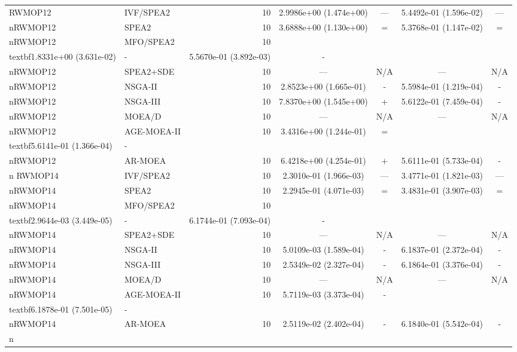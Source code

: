 \begin{table}[t]
{\begin{tabular}{llrcccc}
RWMOP12 & IVF/SPEA2 & 10 & 2.9986e+00 (1.474e+00) & --- & 5.4492e-01 (1.596e-02) & --- \\nRWMOP12 & SPEA2 & 10 & 3.6888e+00 (1.130e+00) & = & 5.3768e-01 (1.147e-02) & = \\nRWMOP12 & MFO/SPEA2 & 10 & \\textbf{1.8331e+00 (3.631e-02)} & - & 5.5670e-01 (3.892e-03) & - \\nRWMOP12 & SPEA2+SDE & 10 & --- & N/A & --- & N/A \\nRWMOP12 & NSGA-II & 10 & 2.8523e+00 (1.665e-01) & - & 5.5984e-01 (1.219e-04) & - \\nRWMOP12 & NSGA-III & 10 & 7.8370e+00 (1.545e+00) & + & 5.6122e-01 (7.459e-04) & - \\nRWMOP12 & MOEA/D & 10 & --- & N/A & --- & N/A \\nRWMOP12 & AGE-MOEA-II & 10 & 3.4316e+00 (1.244e-01) & = & \\textbf{5.6141e-01 (1.366e-04)} & - \\nRWMOP12 & AR-MOEA & 10 & 6.4218e+00 (4.254e-01) & + & 5.6111e-01 (5.733e-04) & - \\n\midrule
RWMOP14 & IVF/SPEA2 & 10 & 2.3010e-01 (1.966e-03) & --- & 3.4771e-01 (1.821e-03) & --- \\nRWMOP14 & SPEA2 & 10 & 2.2945e-01 (4.071e-03) & = & 3.4831e-01 (3.907e-03) & = \\nRWMOP14 & MFO/SPEA2 & 10 & \\textbf{2.9644e-03 (3.449e-05)} & - & 6.1744e-01 (7.093e-04) & - \\nRWMOP14 & SPEA2+SDE & 10 & --- & N/A & --- & N/A \\nRWMOP14 & NSGA-II & 10 & 5.0109e-03 (1.589e-04) & - & 6.1837e-01 (2.372e-04) & - \\nRWMOP14 & NSGA-III & 10 & 2.5349e-02 (2.327e-04) & - & 6.1864e-01 (3.376e-04) & - \\nRWMOP14 & MOEA/D & 10 & --- & N/A & --- & N/A \\nRWMOP14 & AGE-MOEA-II & 10 & 5.7119e-03 (3.373e-04) & - & \\textbf{6.1878e-01 (7.501e-05)} & - \\nRWMOP14 & AR-MOEA & 10 & 2.5119e-02 (2.402e-04) & - & 6.1840e-01 (5.542e-04) & - \\n\midrule

\end{tabular}}
\end{table}
